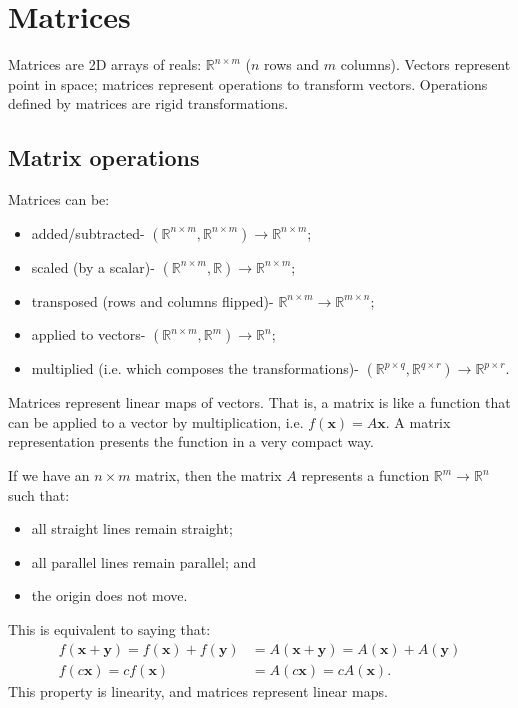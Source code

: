 \documentclass[a4paper, openany]{memoir}
\begin{document}
    \section{Matrices}
    Matrices are 2D arrays of reals: $\mathbb{R}^{n \times m}$ ($n$ rows and $m$ columns). Vectors represent point in space; matrices represent operations to transform vectors. Operations defined by matrices are rigid transformations.
    \subsection{Matrix operations}
    Matrices can be:
    \begin{itemize}
        \item added/subtracted- $(\mathbb{R}^{n \times m}, \mathbb{R}^{n \times m})\to \mathbb{R}^{n \times m}$;
        \item scaled (by a scalar)- $(\mathbb{R}^{n \times m}, \mathbb{R}) \to \mathbb{R}^{n \times m}$;
        \item transposed (rows and columns flipped)- $\mathbb{R}^{n \times m} \to \mathbb{R}^{m \times n}$;
        \item applied to vectors- $(\mathbb{R}^{n \times m}, \mathbb{R}^m) \to \mathbb{R}^n$;
        \item multiplied (i.e. which composes the transformations)- $(\mathbb{R}^{p \times q}, \mathbb{R}^{q \times r}) \to \mathbb{R}^{p \times r}$.
    \end{itemize}

    Matrices represent linear maps of vectors. That is, a matrix is like a function that can be applied to a vector by multiplication, i.e. $f(\mathbf{x}) = A \mathbf{x}$. A matrix representation presents the function in a very compact way.

    If we have an $n \times m$ matrix, then the matrix $A$ represents a function $\mathbb{R}^m \to \mathbb{R}^n$ such that:
    \begin{itemize}
        \item all straight lines remain straight;
        \item all parallel lines remain parallel; and
        \item the origin does not move.
    \end{itemize}
    This is equivalent to saying that:
    \begin{align*}
        f(\mathbf{x}+\mathbf{y}) = f(\mathbf{x}) + f(\mathbf{y}) &= A(\mathbf{x}+\mathbf{y}) = A(\mathbf{x}) + A(\mathbf{y}) \\
        f(c\mathbf{x}) = cf(\mathbf{x}) &= A(c\mathbf{x}) = cA(\mathbf{x}).
    \end{align*}
    This property is linearity, and matrices represent linear maps.
\end{document}

